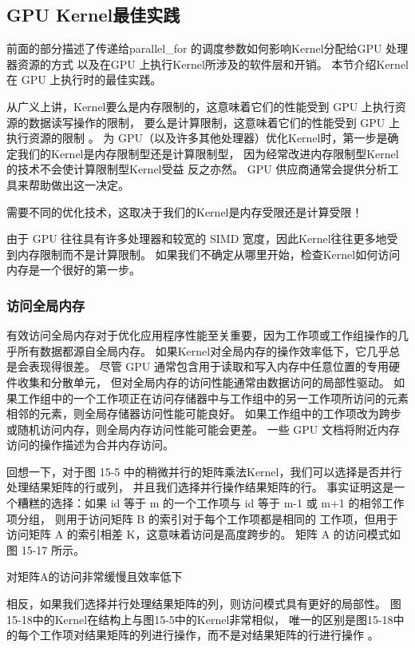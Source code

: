 \subsection{GPU Kernel最佳实践}
前面的部分描述了传递给parallel\_for 的调度参数如何影响Kernel分配给GPU 处理器资源的方式
以及在GPU 上执行Kernel所涉及的软件层和开销。 本节介绍Kernel在 GPU 上执行时的最佳实践。

从广义上讲，Kernel要么是内存限制的，这意味着它们的性能受到 GPU 上执行资源的数据读写操作的限制，
要么是计算限制，这意味着它们的性能受到 GPU 上执行资源的限制 。 
为 GPU（以及许多其他处理器）优化Kernel时，第一步是确定我们的Kernel是内存限制型还是计算限制型，
因为经常改进内存限制型Kernel的技术不会使计算限制型Kernel受益 反之亦然。 
GPU 供应商通常会提供分析工具来帮助做出这一决定。

\begin{remark}
	需要不同的优化技术，这取决于我们的Kernel是内存受限还是计算受限！
\end{remark}

由于 GPU 往往具有许多处理器和较宽的 SIMD 宽度，因此Kernel往往更多地受到内存限制而不是计算限制。 
如果我们不确定从哪里开始，检查Kernel如何访问内存是一个很好的第一步。

\subsubsection{访问全局内存}
有效访问全局内存对于优化应用程序性能至关重要，因为工作项或工作组操作的几乎所有数据都源自全局内存。 
如果Kernel对全局内存的操作效率低下，它几乎总是会表现得很差。 
尽管 GPU 通常包含用于读取和写入内存中任意位置的专用硬件收集和分散单元，
但对全局内存的访问性能通常由数据访问的局部性驱动。 
如果工作组中的一个工作项正在访问存储器中与工作组中的另一工作项所访问的元素相邻的元素，则全局存储器访问性能可能良好。 
如果工作组中的工作项改为跨步或随机访问内存，则全局内存访问性能可能会更差。 
一些 GPU 文档将附近内存访问的操作描述为合并内存访问。

回想一下，对于图 15-5 中的稍微并行的矩阵乘法Kernel，我们可以选择是否并行处理结果矩阵的行或列，
并且我们选择并行操作结果矩阵的行。 
事实证明这是一个糟糕的选择：如果 id 等于 m 的一个工作项与 id 等于 m-1 或 m+1 的相邻工作项分组，
则用于访问矩阵 B 的索引对于每个工作项都是相同的 工作项，但用于访问矩阵 A 的索引相差 K，这意味着访问是高度跨步的。 
矩阵 A 的访问模式如图 15-17 所示。

{\color{red} 对矩阵A的访问非常缓慢且效率低下}

相反，如果我们选择并行处理结果矩阵的列，则访问模式具有更好的局部性。 
图15-18中的Kernel在结构上与图15-5中的Kernel非常相似，
唯一的区别是图15-18中的每个工作项对结果矩阵的列进行操作，而不是对结果矩阵的行进行操作 。

